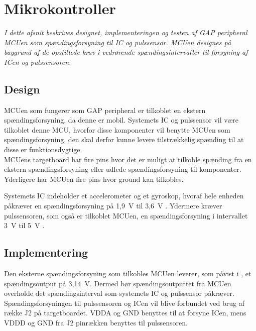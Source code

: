 \section{Mikrokontroller}
\textit{I dette afsnit beskrives designet, implementeringen og testen af GAP peripheral MCUen som spændingsforsyning til IC og pulssensor. MCUen designes på baggrund af de opstillede krav i  vedrørende spændingsintervaller til forsyning af ICen og pulssensoren.}


\subsection{Design}
MCUen som fungerer som GAP peripheral er tilkoblet en ekstern spændingsforsyning, da denne er mobil. Systemets IC og pulssensor vil være tilkoblet denne MCU, hvorfor disse komponenter vil benytte MCUen som spændingsforsyning, den skal derfor kunne levere tilstrækkelig spænding til at disse er funktionsdygtige. \\
MCUens targetboard har fire pins hvor det er muligt at tilkoble spænding fra en ekstern spændingsforsyning eller udlede spændingsforsyning til komponenter. Yderligere har MCUen fire pins hvor ground kan tilkobles. \citep{Semiconductor2016}

Systemets IC indeholder et accelerometer og et gyroskop, hvoraf hele enheden påkræver en spændingsforsyning på 1,9~V til 3,6~V \citep{Jimb02016}.
Ydermere kræver pulssensoren, som også er tilkoblet MCUen, en spændingsforsyning i intervallet 3~V til 5~V \citep{Murphy2016}.

\subsection{Implementering}
Den eksterne spændingsforsyning som tilkobles MCUen leverer, som påvist i , et spændingsoutput på 3,14~V. Dermed bør spændingsoutputtet fra MCUen overholde det spændingsinterval som systemets IC og pulssensor påkræver.\\
Spændingsforsyningen til pulssensoren og ICen vil blive forbundet ved brug af række J2 på targetboardet. VDDA og GND benyttes til at forsyne ICen, mens VDDD og GND fra J2 pinrækken benyttes til pulssensoren.

